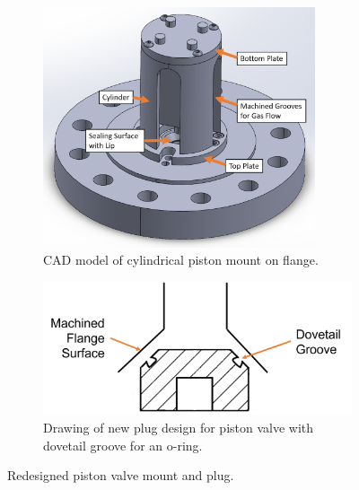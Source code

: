 \begin{figure}[t!]
    \vspace{16pt}
    \centering
    \begin{subfigure}[t]{0.45\textwidth}
        \centering
        \includegraphics[width=0.88\textwidth]{design/photos/piston_mount_gen2_cad_labels.png}
        \caption{CAD model of cylindrical piston mount on flange.}
        \label{fig:cad mount 2}
    \end{subfigure}
    \hfill
    \begin{subfigure}[t]{0.49\textwidth}
        \centering
        \includegraphics[width=\textwidth]{design/photos/new_plug_draw_crop_paint_labels.png}
        \caption{Drawing of new plug design for piston valve with dovetail groove for an o-ring.}
        \label{fig:plug v2 draw}
    \end{subfigure}
    
    \caption{Redesigned piston valve mount and plug.}
    \label{fig:redesign}
    \vspace{16pt}
\end{figure}

